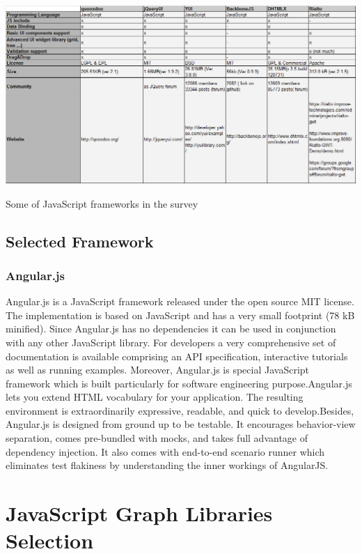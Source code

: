 \documentclass[14pt,a4paper]{extreport}
\begin{document}
			\begin{table}
				\begin{center}
					\includegraphics[scale=0.6]{JavaFrameTable3NewCriteria.png}
				
					\caption{Some of JavaScript frameworks in the survey}
				\end{center}
			
			\end{table}


		\subsection{Selected Framework}
			\subsubsection{Angular.js}
		Angular.js is a JavaScript framework released under the open source MIT license. The implementation is based on JavaScript and has a very small footprint (78 kB minified). Since Angular.js has no dependencies it can be used in conjunction with any other JavaScript library. For developers a very comprehensive set of documentation is available comprising an API specification, interactive tutorials as well as running examples. Moreover, Angular.js is special JavaScript framework which is built particularly for software engineering purpose.Angular.js lets you extend HTML vocabulary for your application. The resulting environment is extraordinarily expressive, readable, and quick to develop.Besides, Angular.js is designed from ground up to be testable. It encourages behavior-view separation, comes pre-bundled with mocks, and takes full advantage of dependency injection. It also comes with end-to-end scenario runner which eliminates test flakiness by understanding the inner workings of AngularJS.
					
 	\section{JavaScript Graph Libraries Selection}
\end{document}
